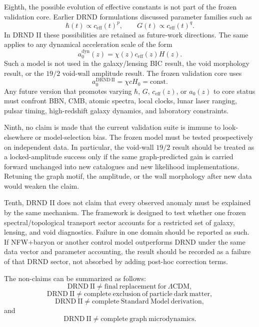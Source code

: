 \documentclass[12pt]{iopart}
\begin{document}
Eighth, the possible evolution of effective constants is not part of the frozen validation core. Earlier DRND formulations discussed parameter families such as
\begin{equation}
\hbar(t)\propto c_{\mathrm{eff}}(t)^p,
\qquad
G(t)\propto c_{\mathrm{eff}}(t)^q.
\end{equation}
In DRND II these possibilities are retained as future-work directions. The same applies to any dynamical acceleration scale of the form
\begin{equation}
a_0^{\mathrm{dyn}}(z)
=
\chi(z)c_{\mathrm{eff}}(z)H(z).
\end{equation}
Such a model is not used in the galaxy/lensing BIC result, the void morphology result, or the \(19/2\) void-wall amplitude result. The frozen validation core uses
\begin{equation}
a_0^{\mathrm{DRND\,II}}
=
\chi cH_0
=
\mathrm{const}.
\end{equation}
Any future version that promotes varying \(\hbar\), \(G\), \(c_{\mathrm{eff}}(z)\), or \(a_0(z)\) to core status must confront BBN, CMB, atomic spectra, local clocks, lunar laser ranging, pulsar timing, high-redshift galaxy dynamics, and laboratory constraints.

Ninth, no claim is made that the current validation suite is immune to look-elsewhere or model-selection bias. The frozen model must be tested prospectively on independent data. In particular, the void-wall \(19/2\) result should be treated as a locked-amplitude success only if the same graph-predicted gain is carried forward unchanged into new catalogues and new likelihood implementations. Retuning the graph motif, the amplitude, or the wall morphology after new data would weaken the claim.

Tenth, DRND II does not claim that every observed anomaly must be explained by the same mechanism. The framework is designed to test whether one frozen spectral/topological transport sector accounts for a restricted set of galaxy, lensing, and void diagnostics. Failure in one domain should be reported as such. If NFW+baryon or another control model outperforms DRND under the same data vector and parameter accounting, the result should be recorded as a failure of that DRND sector, not absorbed by adding post-hoc correction terms.

The non-claims can be summarized as follows:
\begin{equation}
\mathrm{DRND\ II}
\neq
\mathrm{final\ replacement\ for\ }\Lambda\mathrm{CDM},
\end{equation}
\begin{equation}
\mathrm{DRND\ II}
\neq
\mathrm{complete\ exclusion\ of\ particle\ dark\ matter},
\end{equation}
\begin{equation}
\mathrm{DRND\ II}
\neq
\mathrm{complete\ Standard\ Model\ derivation},
\end{equation}
and
\begin{equation}
\mathrm{DRND\ II}
\neq
\mathrm{complete\ graph\ microdynamics}.
\end{equation}
\end{document}

